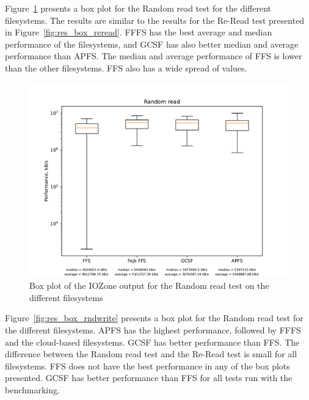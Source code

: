 Figure~\ref{fig:res_box_rndread} presents a box plot for the Random read test for the different filesystems. The results are similar to the results for the \mbox{Re-Read} test presented in Figure~\ref{fig:res_box_reread}. \gls{FFFS} has the best average and median performance of the filesystems, and \gls{GCSF} has also better median and average performance than \gls{APFS}. The median and average performance of \gls{FFS} is lower than the other filesystems. \gls{FFS} also has a wide spread of values.

\begin{figure}[!htb]
	\label{fig:res_box_rndread}
	\begin{center}
		\includegraphics[width=1.0\textwidth]{figures/benchmarking/Random read_box.pdf}
	\end{center}
	\caption{Box plot of the IOZone output for the Random read test on the different filesystems}
\end{figure}

Figure~\ref{fig:res_box_rndwrite} presents a box plot for the Random read test for the different filesystems. \gls{APFS} has the highest performance, followed by \gls{FFFS} and the cloud-based filesystems. \gls{GCSF} has better performance than \gls{FFS}. The difference between the Random read test and the \mbox{Re-Read} test is small for all filesystems. \gls{FFS} does not have the best performance in any of the box plots presented. \gls{GCSF} has better performance than \gls{FFS} for all tests run with the benchmarking.

